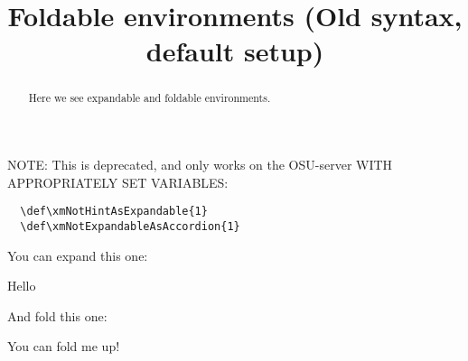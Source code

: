 \documentclass{ximera}
\title{Foldable environments (Old syntax, default setup)}
\begin{document}
\begin{abstract}
  Here we see expandable and foldable environments.
\end{abstract}
\maketitle

NOTE: This is deprecated, and only works on the OSU-server WITH APPROPRIATELY SET VARIABLES:

\begin{verbatim}
  \def\xmNotHintAsExpandable{1}
  \def\xmNotExpandableAsAccordion{1}
\end{verbatim}

You can expand this one:

\begin{expandable}
  Hello
 \begin{center}
 \end{center}
\end{expandable}



And fold this one:

\begin{foldable}
  You can fold me up!
\end{foldable}
\end{document}
